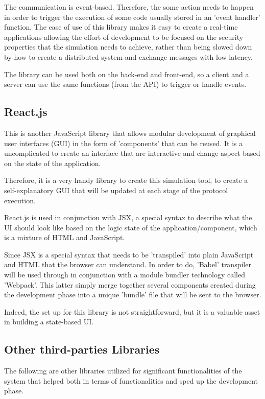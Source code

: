 The communication is event-based. Therefore, the some action needs to happen in order to trigger the execution of some code usually stored in an 'event handler' function.
The ease of use of this library makes it easy to create a real-time applications allowing the effort of development to be focused on the security properties that the simulation needs to achieve, rather than being slowed down by how to create a distributed system and exchange messages with low latency.

The library can be used both on the back-end and front-end, so a client and a server can use the same functions (from the API) to trigger or handle events.


\subsection{React.js}
This is another JavaScript library that allows modular development of graphical user interfaces (GUI) in the form of 'components' that can be reused. It is a uncomplicated to create an interface that are interactive and change aspect based on the state of the application.

Therefore, it is a very handy library to create this simulation tool, to create a self-explanatory GUI that will be updated at each stage of the protocol execution.

React.js is used in conjunction with JSX, a special syntax to describe what the UI should look like based on the logic state of the application/component, which is a mixture of HTML and JavaScript.

Since JSX is a special syntax that needs to be 'transpiled' into plain JavaScript and HTML that the browser can understand. In order to do, 'Babel' transpiler will be used through in conjunction with a module bundler technology called 'Webpack'. This latter simply merge together several components created during the development phase into a unique 'bundle' file that will be sent to the browser.

Indeed, the set up for this library is not straightforward, but it is a valuable asset in building a state-based UI.

\subsection{Other third-parties Libraries}
The following are other libraries utilized for significant functionalities of the system that helped both in terms of functionalities and sped up the development phase.

